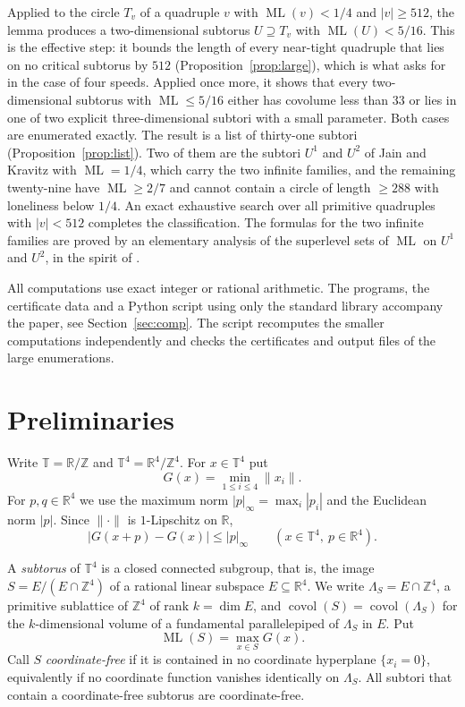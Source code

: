 \documentclass[12pt]{amsart}
\theoremstyle{definition}\newtheorem{definition}[theorem]{Definition}
\theoremstyle{remark}\newtheorem{remark}[theorem]{Remark}
\newcommand{\Z}{\mathbb Z}\newcommand{\R}{\mathbb R}\newcommand{\T}{\mathbb T}
\newcommand{\norm}[1]{\lVert #1\rVert}
\newcommand{\ML}{\operatorname{ML}}
\newcommand{\covol}{\operatorname{covol}}
\newcommand{\supn}[1]{\lvert #1\rvert_\infty}
\newcommand{\eucl}[1]{\lvert #1\rvert}
\newcommand{\Uone}{U^{1}}\newcommand{\Utwo}{U^{2}}
\begin{document}
Applied to the circle $T_v$ of a quadruple $v$ with $\ML(v)<1/4$ and $\eucl v\ge 512$, the lemma produces a two-dimensional subtorus $U\supseteq T_v$ with $\ML(U)<5/16$. This is the effective step: it bounds the length of every near-tight quadruple that lies on no critical subtorus by $512$ (Proposition~\ref{prop:large}), which is what \cite[Question~6.7]{Cordella} asks for in the case of four speeds. Applied once more, it shows that every two-dimensional subtorus with $\ML\le 5/16$ either has covolume less than $33$ or lies in one of two explicit three-dimensional subtori with a small parameter. Both cases are enumerated exactly. The result is a list of thirty-one subtori (Proposition~\ref{prop:list}). Two of them are the subtori $\Uone$ and $\Utwo$ of Jain and Kravitz with $\ML=1/4$, which carry the two infinite families, and the remaining twenty-nine have $\ML\ge 2/7$ and cannot contain a circle of length $\ge 288$ with loneliness below $1/4$. An exact exhaustive search over all primitive quadruples with $\eucl v<512$ completes the classification. The formulas for the two infinite families are proved by an elementary analysis of the superlevel sets of $\ML$ on $\Uone$ and $\Utwo$, in the spirit of \cite{JainKravitz}.

All computations use exact integer or rational arithmetic. The programs, the certificate data and a Python script using only the standard library accompany the paper, see Section~\ref{sec:comp}. The script recomputes the smaller computations independently and checks the certificates and output files of the large enumerations.

\section{Preliminaries}
Write $\T=\R/\Z$ and $\T^4=\R^4/\Z^4$. For $x\in\T^4$ put
\[
 G(x)=\min_{1\le i\le 4}\norm{x_i}.
\]
For $p,q\in\R^4$ we use the maximum norm $\supn{p}=\max_i|p_i|$ and the Euclidean norm $\eucl p$. Since $\norm{\cdot}$ is $1$-Lipschitz on $\R$,
\begin{equation}\label{eq:lip}
 |G(x+p)-G(x)|\le \supn{p}\qquad (x\in\T^4,\ p\in\R^4).
\end{equation}

A \emph{subtorus} of $\T^4$ is a closed connected subgroup, that is, the image $S=E/(E\cap\Z^4)$ of a rational linear subspace $E\subseteq\R^4$. We write $\Lambda_S=E\cap\Z^4$, a primitive sublattice of $\Z^4$ of rank $k=\dim E$, and $\covol(S)=\covol(\Lambda_S)$ for the $k$-dimensional volume of a fundamental parallelepiped of $\Lambda_S$ in $E$. Put
\[
 \ML(S)=\max_{x\in S}G(x).
\]
Call $S$ \emph{coordinate-free} if it is contained in no coordinate hyperplane $\{x_i=0\}$, equivalently if no coordinate function vanishes identically on $\Lambda_S$. All subtori that contain a coordinate-free subtorus are coordinate-free.
\end{document}
